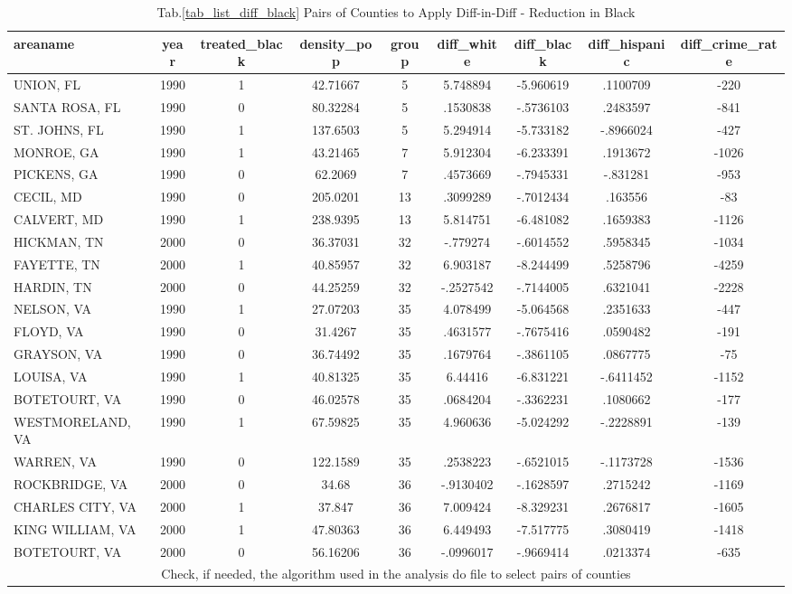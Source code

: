 \documentclass[a4paper,12pt]{article}
\begin{document}
\begin{landscape}
\begin{normalsize}
\begin{center}
\begin{longtable}{lcccccccc}
\caption{Tab.\ref{tab_list_diff_black} Pairs of Counties to Apply Diff-in-Diff  - Reduction in Black\label{tab_list_red_black}}
\hline
areaname&year&treated\_black&density\_pop&group&diff\_white&diff\_black&diff\_hispanic&diff\_crime\_rate \\
\midrule\addlinespace[1.5ex]
UNION, FL&1990&1&42.71667&5&5.748894&-5.960619&.1100709&-220 \\
SANTA ROSA, FL&1990&0&80.32284&5&.1530838&-.5736103&.2483597&-841 \\
ST. JOHNS, FL&1990&1&137.6503&5&5.294914&-5.733182&-.8966024&-427 \\ \hline
MONROE, GA&1990&1&43.21465&7&5.912304&-6.233391&.1913672&-1026 \\
PICKENS, GA&1990&0&62.2069&7&.4573669&-.7945331&-.831281&-953 \\ \hline
CECIL, MD&1990&0&205.0201&13&.3099289&-.7012434&.163556&-83 \\
CALVERT, MD&1990&1&238.9395&13&5.814751&-6.481082&.1659383&-1126 \\ \hline
HICKMAN, TN&2000&0&36.37031&32&-.779274&-.6014552&.5958345&-1034 \\
FAYETTE, TN&2000&1&40.85957&32&6.903187&-8.244499&.5258796&-4259 \\
HARDIN, TN&2000&0&44.25259&32&-.2527542&-.7144005&.6321041&-2228 \\ \hline
NELSON, VA&1990&1&27.07203&35&4.078499&-5.064568&.2351633&-447 \\
FLOYD, VA&1990&0&31.4267&35&.4631577&-.7675416&.0590482&-191 \\
GRAYSON, VA&1990&0&36.74492&35&.1679764&-.3861105&.0867775&-75 \\
LOUISA, VA&1990&1&40.81325&35&6.44416&-6.831221&-.6411452&-1152 \\
BOTETOURT, VA&1990&0&46.02578&35&.0684204&-.3362231&.1080662&-177 \\
WESTMORELAND, VA&1990&1&67.59825&35&4.960636&-5.024292&-.2228891&-139 \\
WARREN, VA&1990&0&122.1589&35&.2538223&-.6521015&-.1173728&-1536 \\ \hline
ROCKBRIDGE, VA&2000&0&34.68&36&-.9130402&-.1628597&.2715242&-1169 \\
CHARLES CITY, VA&2000&1&37.847&36&7.009424&-8.329231&.2676817&-1605 \\
KING WILLIAM, VA&2000&1&47.80363&36&6.449493&-7.517775&.3080419&-1418 \\
BOTETOURT, VA&2000&0&56.16206&36&-.0996017&-.9669414&.0213374&-635 \\
\multicolumn{9}{c}{Check, if needed, the algorithm used in the analysis do file to select pairs of counties} \\
\end{longtable}
\end{center}
\end{normalsize}
\end{landscape}
\end{document}
